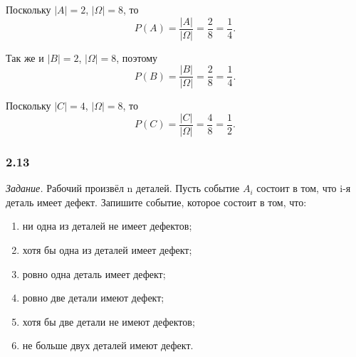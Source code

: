 Поскольку $ |A| = 2 $, $ |\Omega| = 8 $, то
$$ P(A) =
\frac{ |A| }{ |\Omega| } =
\frac{2}{8} =
\frac{1}{4}.$$

Так же и $ |B| = 2 $, $ |\Omega| = 8 $, поэтому
$$ P(B) =
\frac{ |B| }{ |\Omega| } =
\frac{2}{8} =
\frac{1}{4}.$$

Поскольку $ |C| = 4 $, $ |\Omega| = 8 $, то
$$ P(C) =
\frac{ |C| }{ |\Omega| } =
\frac{4}{8} =
\frac{1}{2}.$$

\subsubsection*{2.13}

\textit{Задание.} Рабочий произвёл n деталей.
Пусть событие $ A_i $ состоит в том, что i-я деталь имеет дефект.
Запишите событие, которое состоит в том, что:
\begin{enumerate}[label=\alph*)]
\item ни одна из деталей не имеет дефектов;
\item хотя бы одна из деталей имеет дефект;
\item ровно одна деталь имеет дефект;
\item ровно две детали имеют дефект;
\item хотя бы две детали не имеют дефектов;
\item не больше двух деталей имеют дефект.
\end{enumerate}

